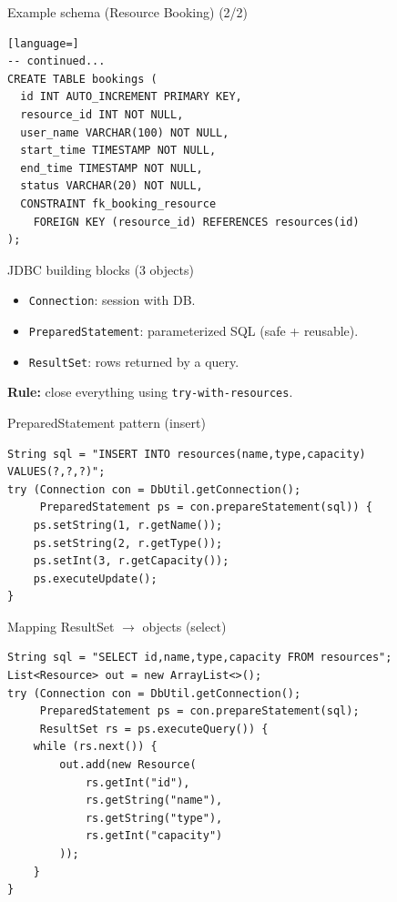 \documentclass{beamer}
\begin{document}
\begin{frame}[fragile]{Example schema (Resource Booking) (2/2)}
\begin{lstlisting}[language=]
-- continued...
CREATE TABLE bookings (
  id INT AUTO_INCREMENT PRIMARY KEY,
  resource_id INT NOT NULL,
  user_name VARCHAR(100) NOT NULL,
  start_time TIMESTAMP NOT NULL,
  end_time TIMESTAMP NOT NULL,
  status VARCHAR(20) NOT NULL,
  CONSTRAINT fk_booking_resource
    FOREIGN KEY (resource_id) REFERENCES resources(id)
);
\end{lstlisting}
  \slidesources{\OOPSUnitVISources}
\end{frame}

\begin{frame}{JDBC building blocks (3 objects)}
  \begin{itemize}[<+->]
    \item \texttt{Connection}: session with DB.
    \item \texttt{PreparedStatement}: parameterized SQL (safe + reusable).
    \item \texttt{ResultSet}: rows returned by a query.
  \end{itemize}
  \vspace{0.6em}
  \textbf{Rule:} close everything using \texttt{try-with-resources}.
  \slidesources{\OOPSUnitVISources}
\end{frame}

\begin{frame}[fragile]{PreparedStatement pattern (insert)}
\begin{lstlisting}
String sql = "INSERT INTO resources(name,type,capacity) VALUES(?,?,?)";
try (Connection con = DbUtil.getConnection();
     PreparedStatement ps = con.prepareStatement(sql)) {
    ps.setString(1, r.getName());
    ps.setString(2, r.getType());
    ps.setInt(3, r.getCapacity());
    ps.executeUpdate();
}
\end{lstlisting}
  \slidesources{\OOPSUnitVISources}
\end{frame}

\begin{frame}[fragile]{Mapping ResultSet $\rightarrow$ objects (select)}
\begin{lstlisting}
String sql = "SELECT id,name,type,capacity FROM resources";
List<Resource> out = new ArrayList<>();
try (Connection con = DbUtil.getConnection();
     PreparedStatement ps = con.prepareStatement(sql);
     ResultSet rs = ps.executeQuery()) {
    while (rs.next()) {
        out.add(new Resource(
            rs.getInt("id"),
            rs.getString("name"),
            rs.getString("type"),
            rs.getInt("capacity")
        ));
    }
}
\end{lstlisting}
  \slidesources{\OOPSUnitVISources}
\end{frame}
\end{document}
